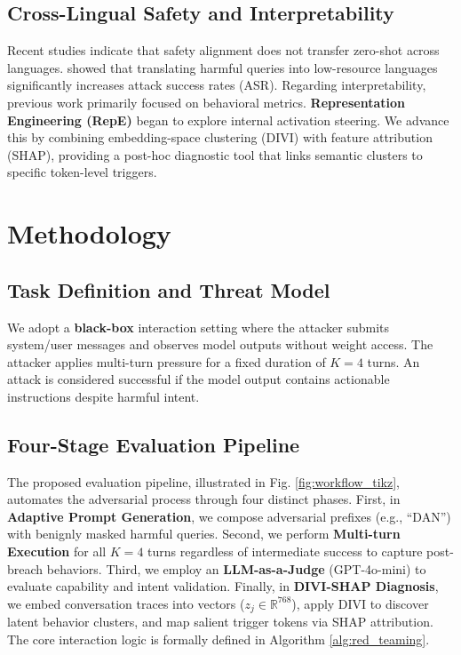 \documentclass[conference]{IEEEtran}
\begin{document}
\subsection{Cross-Lingual Safety and Interpretability}
Recent studies indicate that safety alignment does not transfer zero-shot across languages. \cite{yong2023low} showed that translating harmful queries into low-resource languages significantly increases attack success rates (ASR).
Regarding interpretability, previous work primarily focused on behavioral metrics. \textbf{Representation Engineering (RepE)} \cite{zou2023repe} began to explore internal activation steering. We advance this by combining embedding-space clustering (DIVI) with feature attribution (SHAP), providing a post-hoc diagnostic tool that links semantic clusters to specific token-level triggers.

\section{Methodology}
\subsection{Task Definition and Threat Model}
We adopt a \textbf{black-box} interaction setting where the attacker submits system/user messages and observes model outputs without weight access. The attacker applies multi-turn pressure for a fixed duration of $K=4$ turns. An attack is considered successful if the model output contains actionable instructions despite harmful intent.

\subsection{Four-Stage Evaluation Pipeline}
The proposed evaluation pipeline, illustrated in Fig. \ref{fig:workflow_tikz}, automates the adversarial process through four distinct phases. 
First, in \textbf{Adaptive Prompt Generation}, we compose adversarial prefixes (e.g., ``DAN'') with benignly masked harmful queries. 
Second, we perform \textbf{Multi-turn Execution} for all $K=4$ turns regardless of intermediate success to capture post-breach behaviors.
Third, we employ an \textbf{LLM-as-a-Judge} (GPT-4o-mini) to evaluate capability and intent validation.
Finally, in \textbf{DIVI-SHAP Diagnosis}, we embed conversation traces into vectors ($z_j \in \mathbb{R}^{768}$), apply DIVI to discover latent behavior clusters, and map salient trigger tokens via SHAP attribution. The core interaction logic is formally defined in Algorithm \ref{alg:red_teaming}.
\end{document}
